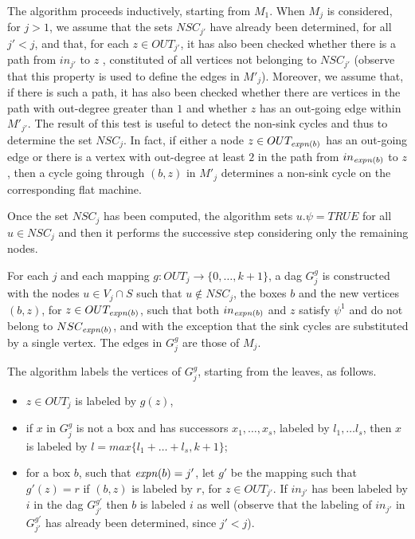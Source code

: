 \documentclass[letterpaper,twocolumn,10pt]{article}
\newcommand{\ignore}[1]{}
\begin{document}
The algorithm  proceeds inductively,
starting from $M_1$. When  $M_j$ is considered, for $j> 1$,  we assume that
the sets  $NSC_{j'}$ have already been determined, for all $j'< j$, and that, for each $z \in OUT_{j'}$,
 it has also been checked
whether there is a path from $in_{j'}$ to $z$ , constituted of all vertices not belonging to $NSC_{j'}$
(observe that  this property is used to define the edges in  $M'_j$).
Moreover, we assume that, if there is such a path, it has also  been  checked whether  there are  vertices in the path with out-degree
greater than $1$ and
whether $z$ has an out-going edge within  $M'_{j'}$.
The result of this test  is useful to detect the non-sink cycles and thus to
determine the  set $NSC_j$.
In fact,   if  either a node $z \in OUT_{\mathit{expn}(b)}$
 has an out-going edge or there is a vertex with out-degree
at least $2$ in the path from $in_{\mathit{expn}(b)}$ to $z$, then
a cycle going through  $(b,z)$ in $M'_j$ determines  a non-sink cycle on the corresponding flat machine.



Once the set  $NSC_j$ has been computed, the algorithm sets $u.\psi=TRUE$ for all
$u \in NSC_j$ and then it performs the successive step considering only the remaining nodes.

For each $j$ and each
mapping  $g:OUT_j \rightarrow \{0,\ldots,k+1\}$, a dag $G_j^g$ is constructed with the
nodes $u \in V_j \cap S$ such that  $ u \notin NSC_j$, the boxes $b$ and the new vertices  $(b,z)$, for $z \in OUT_{\mathit{expn}(b)}$,
 such that  both
$in_{\mathit{expn}(b)}$ and $z $ satisfy $\psi^1$ and do not belong to $ NSC_{\mathit{expn}(b)}$, and with
the exception that the sink cycles are substituted
by a single vertex. The edges in  $G_j^g$  are those of  $M_j$.



\ignore{
If $j>h$, we inductively assume that for  $j'<j$ and
for all the nodes $x$  of $M_{j'}^{g'}$,
for a mapping $g': OUT_{j'} \rightarrow \{0,\ldots,k+1\}$,
$x.\psi=TRUE$ if $x$ satisfies $\psi$ and

for a mapping $g': OUT_{j'} \rightarrow \{0,\ldots,k+1\}$,,
the maximum value $m$ in $\{1,\dots,k+1\}$
such that $in_{j'}^{g'}$ satisfies $\psi^m$ has been determined.}

 The algorithm
labels the vertices of $G_j^g$,  starting from  the leaves,   as follows.


\begin{itemize}
\item
 $z \in OUT_j$ is labeled by $g(z)$,
\item
if $x$ in $G_j^g$ is not a box  and
 has successors $x_1,\dots,x_s$, labeled by $l_1,\dots l_s$, then $x$ is labeled by
 $l=max \{l_1+ \dots +l_s, k+1\}$;
\item
for a box $b$, such that $\mathit{expn}(b)=j'$, let $g'$ be the mapping  such that  $g'(z)=r$ if $(b,z)$
is labeled by $r$, for $z \in OUT_{j'}$.
If  $in_{j'}$ has been labeled by $i$ in the dag  $G_{j'}^{g'}$  then $b$ is labeled $i$ as well
(observe that  the labeling of $in_{j'}$ in   $G_{j'}^{g'}$ has already been determined,  since $j'<j$).
\end{itemize}
\end{document}
